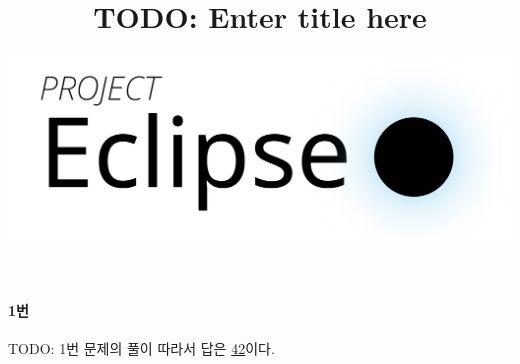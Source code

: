 \documentclass{article}
\title{TODO: Enter title here}
\author{
    \includegraphics[scale=0.25]{logo}
}
\date{}
\begin{document}
\maketitle

\paragraph{1번}
TODO: 1번 문제의 풀이 \newline
따라서 답은 \underline{42}이다.
\end{document}
